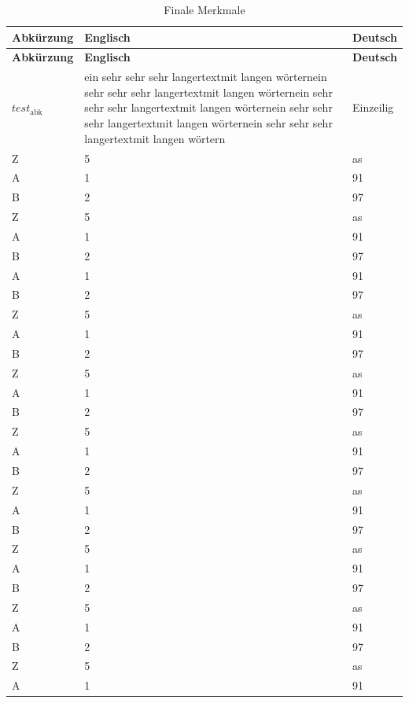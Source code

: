 \documentclass[
12pt, %
toc=listofnumbered, %
toc=chapterentrydotfill, %
numbers=noenddot, %
captions=tableheading, %
]{scrreprt}
\begin{document}
\begin{longtable}{|L{3.6cm}|L{6cm}|L{6cm}|}
	\caption{Finale Merkmale}\label{tab:longtable}\\
	\hline
	\textbf{Abkürzung}&\textbf{Englisch}&\textbf{Deutsch}\\
	\hline
	\endfirsthead %
	\hline
	\textbf{Abkürzung}&\textbf{Englisch}&\textbf{Deutsch}\\
	\hline
	\endhead %
    \hline
    \endfoot
    \hline
    \endlastfoot
	$test_{\mathrm{abk}}$&ein sehr sehr sehr langertextmit langen wörternein sehr sehr sehr langertextmit langen wörternein sehr sehr sehr langertextmit langen wörternein sehr sehr sehr langertextmit langen wörternein sehr sehr sehr langertextmit langen wörtern&Einzeilig\\
	Z&5&as\\\hline
	A&1&91\\\hline
	B&2&97\\\hline
	Z&5&as\\\hline
	A&1&91\\\hline
	B&2&97\\\hline
	A&1&91\\\hline
	B&2&97\\\hline
	Z&5&as\\\hline
	A&1&91\\\hline
	B&2&97\\\hline
    Z&5&as\\\hline
	A&1&91\\\hline
	B&2&97\\\hline
	Z&5&as\\\hline
	A&1&91\\\hline
	B&2&97\\\hline
    Z&5&as\\\hline
	A&1&91\\\hline
	B&2&97\\\hline
	Z&5&as\\\hline
	A&1&91\\\hline
	B&2&97\\\hline
    Z&5&as\\\hline
	A&1&91\\\hline
	B&2&97\\\hline
	Z&5&as\\\hline
	A&1&91\\\hline

\end{longtable}
\end{document}
